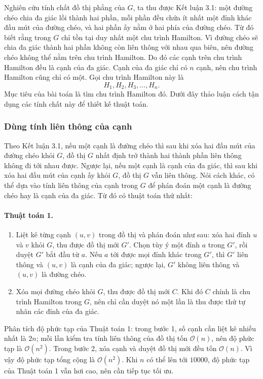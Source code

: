 \documentclass[11pt]{article}
\newcommand{\Oh}{\mathcal{O}}
\begin{document}
Nghiên cứu tính chất đồ thị phẳng của \(G\), ta thu được Kết luận 3.1: một
đường chéo chia đa giác lồi thành hai phần, mỗi phần đều chứa ít nhất một đỉnh
khác đầu mút của đường chéo, và hai phần ấy nằm ở hai phía của đường chéo. Từ
đó biết rằng trong \(G\) chỉ tồn tại duy nhất một chu trình Hamilton. Vì đường
chéo sẽ chia đa giác thành hai phần không còn liên thông với nhau qua biên, nên
đường chéo không thể nằm trên chu trình Hamilton. Do đó các cạnh trên chu trình
Hamilton đều là cạnh của đa giác. Cạnh của đa giác chỉ có \(n\) cạnh, nên chu
trình Hamilton cũng chỉ có một. Gọi chu trình Hamilton này là
\[
  H_1,H_2,H_3,\ldots,H_n.
\]
Mục tiêu của bài toán là tìm chu trình Hamilton đó. Dưới đây thảo luận cách
tận dụng các tính chất này để thiết kế thuật toán.

\subsubsection{Dùng tính liên thông của cạnh}

Theo Kết luận 3.1, nếu một cạnh là đường chéo thì sau khi xóa hai đầu mút của
đường chéo khỏi \(G\), đồ thị \(G\) nhất định trở thành hai thành phần liên
thông không đi tới nhau được. Ngược lại, nếu một cạnh là cạnh của đa giác, thì
sau khi xóa hai đầu mút của cạnh ấy khỏi \(G\), đồ thị \(G\) vẫn liên thông.
Nói cách khác, có thể dựa vào tính liên thông của cạnh trong \(G\) để phán đoán
một cạnh là đường chéo hay là cạnh của đa giác. Từ đó có thuật toán thứ nhất:

\paragraph{Thuật toán 1.}
\begin{enumerate}
  \item Liệt kê từng cạnh \((u,v)\) trong đồ thị và phán đoán như sau: xóa hai
  đỉnh \(u\) và \(v\) khỏi \(G\), thu được đồ thị mới \(G'\). Chọn tùy ý một
  đỉnh \(a\) trong \(G'\), rồi duyệt \(G'\) bắt đầu từ \(a\). Nếu \(a\) tới
  được mọi đỉnh khác trong \(G'\), thì \(G'\) liên thông và \((u,v)\) là cạnh
  của đa giác; ngược lại, \(G'\) không liên thông và \((u,v)\) là đường chéo.
  \item Xóa mọi đường chéo khỏi \(G\), thu được đồ thị mới \(C\). Khi đó \(C\)
  chính là chu trình Hamilton trong \(G\), nên chỉ cần duyệt nó một lần là thu
  được thứ tự nhãn các đỉnh của đa giác.
\end{enumerate}

Phân tích độ phức tạp của Thuật toán 1: trong bước 1, số cạnh cần liệt kê nhiều
nhất là \(2n\); mỗi lần kiểm tra tính liên thông của đồ thị tốn \(\Oh(n)\), nên
độ phức tạp là \(\Oh(n^2)\). Trong bước 2, xóa cạnh và duyệt đồ thị mới đều
tốn \(\Oh(n)\). Vì vậy độ phức tạp tổng cộng là \(\Oh(n^2)\). Khi \(n\) có thể
lên tới \(10000\), độ phức tạp của Thuật toán 1 vẫn hơi cao, nên cần tiếp tục
tối ưu.
\end{document}
